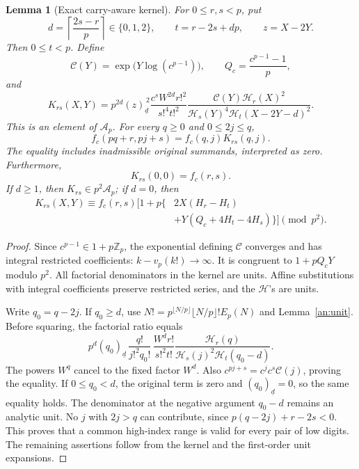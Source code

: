 \documentclass[11pt,a4paper]{article}
\newtheorem{lemma}[theorem]{Lemma}
\theoremstyle{remark}\newtheorem{remark}[theorem]{Remark}
\newcommand{\Z}{\mathbb Z}
\begin{document}
\begin{lemma}[Exact carry-aware kernel]\label{an:kernel}
For \(0\le r,s<p\), put
\[
 d=\left\lceil\frac{2s-r}{p}\right\rceil\in\{0,1,2\},
 \qquad t=r-2s+dp,\qquad z=X-2Y.
\]
Then \(0\le t<p\). Define
\[
 \mathcal C(Y)=\exp\bigl(Y\log(c^{p-1})\bigr),\qquad
 Q_c=\frac{c^{p-1}-1}{p},
\]
and
\[
 K_{rs}(X,Y)=
 p^{2d}(z)_{\underline d}^{\,2}
 \frac{c^s W^{2d}r!^2}{s!^4t!^2}
 \frac{\mathcal C(Y)\mathcal H_r(X)^2}
 {\mathcal H_s(Y)^4\mathcal H_t(X-2Y-d)^2}.
\]
This is an element of \(\mathcal A_p\). For every \(q\ge0\) and
\(0\le2j\le q\),
\[
 f_c(pq+r,pj+s)=f_c(q,j)K_{rs}(q,j).
\]
The equality includes inadmissible original summands, interpreted as zero.
Furthermore,
\[
 K_{rs}(0,0)=f_c(r,s).
\]
If \(d\ge1\), then
\(K_{rs}\in p^2\mathcal A_p\); if \(d=0\), then
\[
 \begin{split}
 K_{rs}(X,Y)\equiv f_c(r,s)\bigl[1+p\{&
 2X(H_r-H_t)\\
 &+Y(Q_c+4H_t-4H_s)\}\bigr]\pmod{p^2}.
 \end{split}
\]
\end{lemma}
\begin{proof}
Since \(c^{p-1}\in1+p\Z_p\), the exponential defining \(\mathcal C\)
converges and has integral restricted coefficients:
\(k-v_p(k!)\to\infty\). It is congruent to \(1+pQ_cY\) modulo \(p^2\).
All factorial denominators in the kernel are units. Affine substitutions
with integral coefficients preserve restricted series, and the
\(\mathcal H\)'s are units.

Write \(q_0=q-2j\). If \(q_0\ge d\), use
\(N!=p^{\lfloor N/p\rfloor}\lfloor N/p\rfloor!E_p(N)\)
and Lemma~\ref{an:unit}. Before squaring, the factorial ratio equals
\[
 p^d(q_0)_{\underline d}\,
 \frac{q!}{j!^2q_0!}\,
 \frac{W^d r!}{s!^2t!}
 \frac{\mathcal H_r(q)}
 {\mathcal H_s(j)^2\mathcal H_t(q_0-d)}.
\]
The powers \(W^q\) cancel to the fixed factor \(W^d\).
Also \(c^{pj+s}=c^j c^s\mathcal C(j)\), proving the equality.
If \(0\le q_0<d\), the original term is zero and
\((q_0)_{\underline d}=0\), so the same equality holds. The denominator
at the negative argument \(q_0-d\) remains an analytic unit.
No \(j\) with \(2j>q\) can contribute, since
\(p(q-2j)+r-2s<0\). This proves that a common high-index range is valid
for every pair of low digits. The remaining assertions follow from
the kernel and the first-order unit expansions.
\end{proof}
\end{document}
